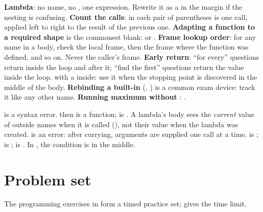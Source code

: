 \documentclass[10pt]{scrartcl}
\begin{document}
\begin{shortcuts}
  \ii \textbf{Lambda}: no name, no , one expression. Rewrite it as a  in the margin if the nesting is confusing.
  \ii \textbf{Count the calls}: in  each pair of parentheses is one call, applied left to right to the result of the previous one.
  \ii \textbf{Adapting a function to a required shape} is the commonest blank:  or .
  \ii \textbf{Frame lookup order}: for any name in a body, check the local frame, then the frame where the function was defined, and so on. Never the caller's frame.
  \ii \textbf{Early return}: ``for every'' questions return  inside the loop and  after it; ``find the first'' questions return the value inside the loop.
  \ii \textbf{} with a  inside: use it when the stopping point is discovered in the middle of the body.
  \ii \textbf{Rebinding a built-in} (, ) is a common exam device: track it like any other name.
  \ii \textbf{Running maximum without }: .
\end{shortcuts}
\begin{trapbox}
  \ii {} is a syntax error.
  \ii {} then  is a function;  is .
  \ii A lambda's body sees the \emph{current} value of outside names when it is called (), not their value when the lambda was created.
  \ii {} is an error: after currying, arguments are supplied one call at a time.
  \ii {} is ;  is ;  is .
  \ii In , the condition is in the middle.
\end{trapbox}

\section{Problem set}
The programming exercises in  form a timed practice set;  gives the time limit.
\end{document}
